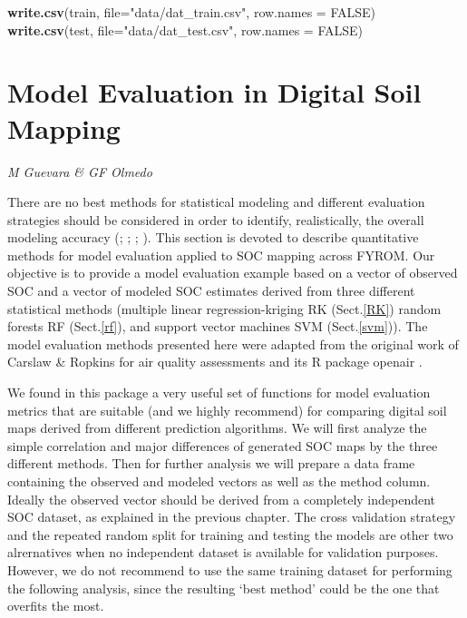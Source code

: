 \documentclass[10pt,b5paper,]{book}
\newenvironment{Shaded}{\begin{snugshade}}{\end{snugshade}}
\newcommand{\DataTypeTok}[1]{\textcolor[rgb]{0.13,0.29,0.53}{#1}}
\newcommand{\KeywordTok}[1]{\textcolor[rgb]{0.13,0.29,0.53}{\textbf{#1}}}
\newcommand{\NormalTok}[1]{#1}
\newcommand{\OtherTok}[1]{\textcolor[rgb]{0.56,0.35,0.01}{#1}}
\newcommand{\StringTok}[1]{\textcolor[rgb]{0.31,0.60,0.02}{#1}}
\theoremstyle{definition}
\theoremstyle{definition}
\theoremstyle{definition}
\theoremstyle{remark}
\begin{document}
\begin{Shaded}
\begin{Highlighting}[]
\KeywordTok{write.csv}\NormalTok{(train, }\DataTypeTok{file=}\StringTok{"data/dat_train.csv"}\NormalTok{, }\DataTypeTok{row.names =} \OtherTok{FALSE}\NormalTok{)}
\KeywordTok{write.csv}\NormalTok{(test, }\DataTypeTok{file=}\StringTok{"data/dat_test.csv"}\NormalTok{, }\DataTypeTok{row.names =} \OtherTok{FALSE}\NormalTok{)}
\end{Highlighting}
\end{Shaded}

\hypertarget{model-evaluation-in-digital-soil-mapping}{%
\chapter{Model Evaluation in Digital Soil
Mapping}\label{model-evaluation-in-digital-soil-mapping}}

\emph{M Guevara \& GF Olmedo}

There are no best methods for statistical modeling and different
evaluation strategies should be considered in order to identify,
realistically, the overall modeling accuracy (\citet{ho2002simple};
\citet{qiao2015no}; \citet{soil-2017-40};
\citet{nussbaum2018evaluation}). This section is devoted to describe
quantitative methods for model evaluation applied to SOC mapping across
FYROM. Our objective is to provide a model evaluation example based on a
vector of observed SOC and a vector of modeled SOC estimates derived
from three different statistical methods (multiple linear
regression-kriging RK (Sect.\ref{RK}) random forests RF (Sect.\ref{rf}),
and support vector machines SVM (Sect.\ref{svm})). The model evaluation
methods presented here were adapted from the original work of Carslaw \&
Ropkins for air quality assessments and its R package openair
\citep{openair}.

We found in this package a very useful set of functions for model
evaluation metrics that are suitable (and we highly recommend) for
comparing digital soil maps derived from different prediction
algorithms. We will first analyze the simple correlation and major
differences of generated SOC maps by the three different methods. Then
for further analysis we will prepare a data frame containing the
observed and modeled vectors as well as the method column. Ideally the
observed vector should be derived from a completely independent SOC
dataset, as explained in the previous chapter. The cross validation
strategy and the repeated random split for training and testing the
models are other two alrernatives when no independent dataset is
available for validation purposes. However, we do not recommend to use
the same training dataset for performing the following analysis, since
the resulting `best method' could be the one that overfits the most.
\end{document}
